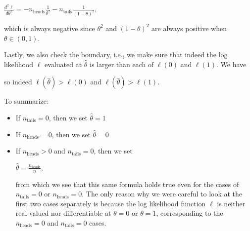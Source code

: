\documentclass[6008notes.tex]{subfiles}
\begin{document}
{\centering$\frac{d^{2}\ell }{d\theta ^{2}}=-n_{\text {heads}}\frac{1}{\theta ^{2}}-n_{\text {tails}}\frac{1}{(1-\theta )^{2}},$ \par}
 
which is always negative since $\theta^2$ and $(1-\theta )^{2}$ are always positive when $\theta \in (0,1)$.

Lastly, we also check the boundary, i.e., we make sure that indeed the log likelihood $\ell$ evaluated at $\widehat{\theta}$ is larger than each of $\ell(0)$ and $\ell(1)$. We have

{ \par}
	
so indeed $\ell (\widehat{\theta }) > \ell (0)$ and $\ell (\widehat{\theta }) > \ell (1)$.

To summarize:

\begin{itemize}
\item If $n_{\text {tails}}=0$, then we set $\widehat{\theta }=1$

\item If $n_{\text {heads}}=0$, then we set $\widehat{\theta }=0$

\item If $n_{\text {heads}}>0$ and $n_{\text {tails}}=0$, then we set 

{\centering$\widehat{\theta }=\frac{n_{\text {heads}}}{n},$ \par}
 
from which we see that this same formula holds true even for the cases of $n_{\text {tails}}=0$ or $n_{\text {heads}}=0$. The only reason why we were careful to look at the first two cases separately is because the log likelihood function $\ell$ is neither real-valued nor differentiable at $\theta=0$ or $\theta=1$, corresponding to the $n_{\text {heads}}=0$ and $n_{\text {tails}}=0$ cases.
\end{itemize}
\end{document}
